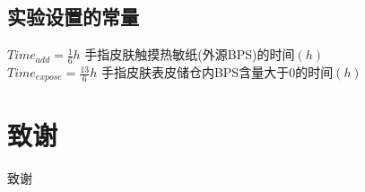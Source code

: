 \documentclass[a4paper,punct=banjiao,twoside]{ctexrep}
\theoremstyle{plain}
\theoremstyle{definition}
\theoremstyle{remark}
\begin{document}
\section*{实验设置的常量}
\noindent$Time_{add}=\frac{1}{6}h$ {\hfill  手指皮肤触摸热敏纸(外源BPS)的时间$(h)$}\\
$Time_{expose}=\frac{13}{6}h$ {\hfill  手指皮肤表皮储仓内BPS含量大于0的时间$(h)$}\\
\clearpage
\mbox{}
\thispagestyle{empty}


% 



\clearpage
\mbox{}
\thispagestyle{empty}

\chapter*{致\quad 谢}
\normalsize
致谢
\end{document}
